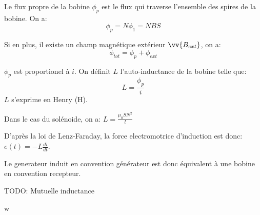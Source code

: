 \begin{definition}
    Le flux propre de la bobine $\phi_p$ est le flux qui traverse l'ensemble des spires de la bobine. On a:
    \[ \phi_p = N\phi_1 = NBS\]
\end{definition}

\begin{remark}
    Si en plus, il existe un champ magnétique extérieur $\vv{B_{ext}}$, on a:
    \[ \phi_{tot} = \phi_{p} + \phi_{ext} \]
\end{remark}

\begin{definition}
    $\phi_p$ est proportionel à $i$. On définit $L$ l'auto-inductance de la bobine telle que:
    \[ L = \frac{\phi_p}{i} \]
    $L$ s'exprime en Henry (H).
\end{definition}

\begin{remark}
    Dans le cas du solénoide, on a: $L = \frac{\mu_0 S N^2}{l}$
\end{remark}

\begin{proposition}
    D'après la loi de Lenz-Faraday, la force electromotrice d'induction est donc: $e(t) = -L\frac{di}{dt}$.

    Le generateur induit en convention générateur est donc équivalent à une bobine en convention recepteur.
\end{proposition}


TODO: Mutuelle inductance

w